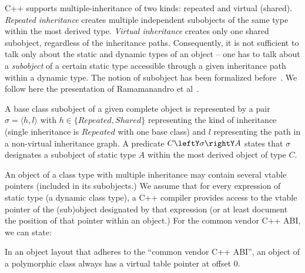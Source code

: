 C++ supports multiple-inheritance of two kinds: repeated and virtual (shared). 
\emph{Repeated inheritance} creates multiple independent subobjects of the same 
type within the most derived type. \emph{Virtual inheritance} creates only one 
shared subobject, regardless of the inheritance paths. Consequently,
it is not sufficient to talk only about the 
static and dynamic types of an object -- one has to talk about a 
\emph{subobject} of a certain static type accessible through a given inheritance 
path within a dynamic type. The notion of subobject has been formalized 
before~\cite{RF95,WNST06,RDL11}. We follow here the presentation of Ramamanandro 
et al~\cite{RDL11}.

A base class subobject of a given complete object is represented by a pair 
$\sigma = \langle h,l\rangle$ with $h \in \{Repeated,Shared\}$ representing the 
kind of inheritance (single inheritance is $Repeated$ with one base class) and $l$ 
representing the path in a non-virtual inheritance graph.
A predicate $C\leftY\sigma\rightY A$ states that $\sigma$ 
designates a subobject of static type $A$ within the most derived object of 
type $C$.

An object of a class
type with multiple inheritance may contain several vtable pointers
(included in its subobjects.)  We assume that for every expression of
static type  (a dynamic class type), a C++ compiler provides
access to the vtable pointer of the (sub)object designated by that 
expression (or at least document the position of that
pointer within an object.)  For the common vendor C++ ABI, we can state:
\begin{lemma}
  In an object layout that adheres to the ``common vendor C++ ABI'', 
  an object of a polymorphic class always has a virtual table pointer
  at offset 0.
\label{lem:vtbl}
\end{lemma}

\noindent

